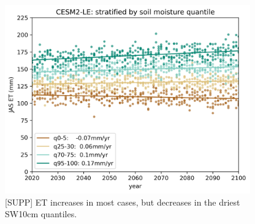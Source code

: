 \documentclass[11pt]{article}
\begin{document}
\begin{figure}[h]
\centering
\includegraphics[width=25pc]{figs/supp/et_trends.png}
\caption{[SUPP] ET increases in most cases, but decreases in the driest SW10cm quantiles.}
\label{fig:precip}
\end{figure}



\nocite{*}

\end{document}
